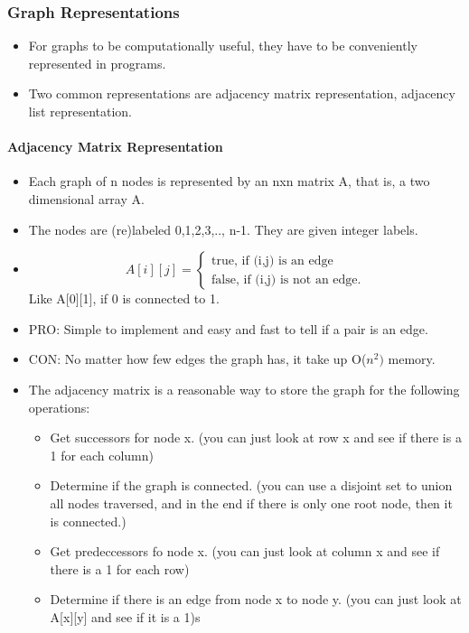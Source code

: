 \documentclass[10pt]{article}
\begin{document}
\subsubsection{Graph Representations}
\begin{itemize}
    \item For graphs to be computationally useful, they have to be conveniently represented in programs.
    \item Two common representations are adjacency matrix representation, adjacency list representation.
\end{itemize}

\paragraph{Adjacency Matrix Representation}
\begin{itemize}
    \item Each graph of n nodes is represented by an nxn matrix A, that is, a two dimensional array A.
    \item The nodes are (re)labeled 0,1,2,3,.., n-1. They are given integer labels.
    \item \[A[i][j]=
              \begin{cases}
                  \textrm{true, if (i,j) is an edge} \\
                  \textrm{false, if (i,j) is not an edge.}
              \end{cases}\]
          Like A[0][1], if 0 is connected to 1.
    \item PRO: Simple to implement and easy and fast to tell if a pair is an edge.
    \item CON: No matter how few edges the graph has, it take up O($n^2)$ memory.
    \item The adjacency matrix is a reasonable way to store the graph for the following operations:
          \begin{itemize}
              \item Get successors for node x. (you can just look at row x and see if there is a 1 for each column)
              \item Determine if the graph is connected. (you can use a disjoint set to union all nodes traversed, and in the end if there is only one root node, then it is connected.)
              \item Get predeccessors fo node x. (you can just look at column x and see if there is a 1 for each row)
              \item Determine if there is an edge from node x to node y. (you can just look at A[x][y] and see if it is a 1)s

\end{itemize}
\end{itemize}
\end{document}
